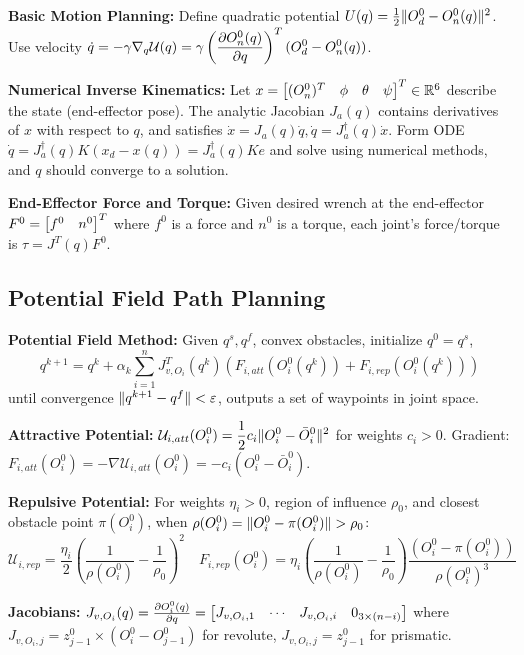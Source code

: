 \documentclass[twocolumn, 8pt]{extarticle}
\begin{document}
\textbf{Basic Motion Planning:} Define quadratic potential \(U(q) = \frac{1}{2}\lVert O_d^0 - O_n^0(q)\rVert^2\).
Use velocity
\(\displaystyle \dot q = -\gamma\nabla _q\mathcal U(q) = \gamma\left(\frac{\partial O_n^0(q)}{\partial q}\right)^T(O_d^0 - O_n^0(q))\).

\textbf{Numerical Inverse Kinematics:} Let \(x = \rvec{(O_n^0)^T}{\phi}{\theta}{\psi}^T \in \reals^6\) describe the state (end-effector pose).
The analytic Jacobian \(J_a(q)\) contains derivatives of \(x\) with respect to \(q\), and satisfies
\(\dot x = J_a(q)\dot q, \dot q = J_a^\dagger(q)\dot x\).
Form ODE \(\dot q = J_a^\dagger(q)K(x_d - x(q)) = J_a^\dagger(q)Ke\) and solve using numerical methods, and \(q\) should
converge to a solution.

\textbf{End-Effector Force and Torque:}
Given desired wrench at the end-effector \(F^0 = \rvec{f^0}{n^0}^T\) where \(f^0\) is a force and \(n^0\) is a torque,
each joint's force/torque is \(\tau = J^T(q)F^0\).

\subsection{Potential Field Path Planning}

\textbf{Potential Field Method:} Given \(q^s, q^f\), convex obstacles, initialize \(q^0 = q^s\),
\[q^{k + 1} = q^k + \alpha _k\sum _{i = 1}^n J_{v,O_i}^T(q^k)\left(F_{i,att}(O_i^0(q^k)) + F_{i,rep}(O_i^0(q^k))\right)\]
until convergence \(\lVert q^{k + 1} - q^f\rVert < \varepsilon\), outputs a set of waypoints in joint space.

\textbf{Attractive Potential:} $\displaystyle \mathcal U_{i, att}(O_i^0) = \frac{1}{2}c_i\lVert O_i^0 - \bar O_i^0\rVert^2$ for weights
$c_i > 0$. Gradient: \(\displaystyle F_{i, att}(O_i^0) = -\nabla \mathcal U_{i, att}(O_i^0) = -c_i(O_i^0 - \bar O_i^0)\).

\textbf{Repulsive Potential:} For weights \(\eta_i > 0\), region of influence \(\rho _0\), and closest obstacle point
\(\pi(O_i^0)\), when \(\rho(O_i^0) = \lVert O_i^0 - \pi(O_i^0)\rVert > \rho _0\):
\[\mathcal U_{i, rep} = \frac{\eta _i}{2}\left(\frac{1}{\rho(O_i^0)} - \frac{1}{\rho _0}\right)^2
\quad F_{i,rep}(O_i^0) = \eta _i\left(\frac{1}{\rho(O_i^0)} - \frac{1}{\rho _0}\right)\frac{(O_i^0 - \pi(O_i^0))}{\rho(O_i^0)^3}\]

\textbf{Jacobians:} \(J_{v,O_i}(q) = \pdiff{O_i^0(q)}{q} = \rvec{J_{v,O_i,1}}{\cdots}{J_{v,O_i,i}}{0_{3 \times (n - i)}}\)
where \(J_{v,O_i,j} = z_{j - 1}^0 \times (O_i^0 - O_{j - 1}^0)\) for revolute, \(J_{v,O_i,j} = z_{j - 1}^0\) for prismatic.
\end{document}

